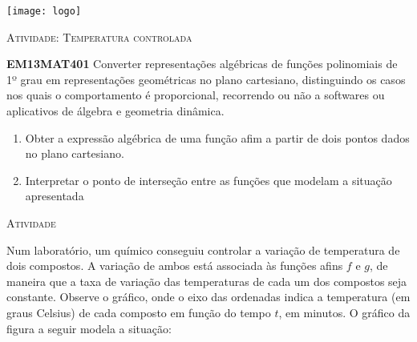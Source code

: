 \documentclass[10 pt,usenames,dvipsnames, oneside]{article}
\begin{document}
\begin{center}
  \begin{minipage}[l]{3cm}
\texttt{[image: logo]}    
\end{minipage}\hfill
\begin{minipage}[r]{.8\textwidth}
 {\Large \scshape Atividade: Temperatura controlada}  
\end{minipage}
\end{center}
\vspace{.2cm}

\ifdefined\prof
\begin{objetivos}
\item \textbf{EM13MAT401} Converter representações algébricas de funções polinomiais de 1º grau em representações geométricas no plano cartesiano, distinguindo os casos nos quais o comportamento é proporcional, recorrendo ou não a softwares ou aplicativos de álgebra e geometria dinâmica.
\end{objetivos}

\begin{goals}
\begin{enumerate}
\item Obter a expressão algébrica de uma função afim a partir de dois pontos dados no plano cartesiano.
\item Interpretar o ponto de interseção entre as funções que modelam a situação apresentada
\end{enumerate}

\end{goals}


\bigskip
\begin{center}
{\large \scshape Atividade}
\end{center}
\fi

Num laboratório, um químico conseguiu controlar a variação de temperatura de dois compostos. A variação de ambos está associada às funções afins \(f\) e \(g\), de maneira que a taxa de variação das temperaturas de cada um dos compostos seja constante. Observe o gráfico, onde o eixo das ordenadas indica a temperatura (em graus Celsius) de cada composto em função do tempo \(t\), em minutos. O gráfico da figura a seguir modela a situação:

\begin{figure}[H]
\centering

\end{figure}
\end{document}
